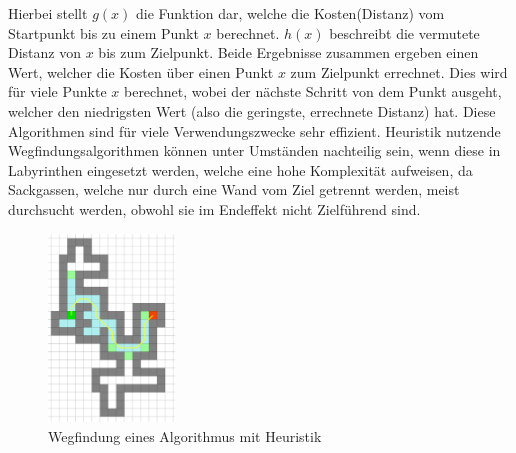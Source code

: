 {{{{			Hierbei stellt $g(x)$ die Funktion dar, welche die Kosten(Distanz) vom Startpunkt bis zu einem Punkt $x$ berechnet. $h(x)$ beschreibt die vermutete Distanz von $x$ bis zum Zielpunkt. Beide Ergebnisse zusammen ergeben einen Wert, welcher die Kosten über einen Punkt $x$ zum Zielpunkt errechnet. Dies wird für viele Punkte $x$ berechnet, wobei der nächste Schritt von dem Punkt ausgeht, welcher den niedrigsten Wert (also die geringste, errechnete Distanz) hat.
			Diese Algorithmen sind für viele Verwendungszwecke sehr effizient. Heuristik nutzende Wegfindungsalgorithmen können unter Umständen nachteilig sein, wenn diese in Labyrinthen eingesetzt werden, welche eine hohe Komplexität aufweisen, da Sackgassen, welche nur durch eine Wand vom Ziel getrennt werden, meist durchsucht werden, obwohl sie im Endeffekt nicht Zielführend sind. \parencite{pathfindingsmpl}
			
			\begin{figure}[H]
				\centering
				\includegraphics[height=5cm]{Bilder/pathfinding_laby_heu.png}
				\caption{Wegfindung eines Algorithmus mit Heuristik} 
				\label{pic:pathlabheu}
			\end{figure}
		
		
		
		
}}}}
